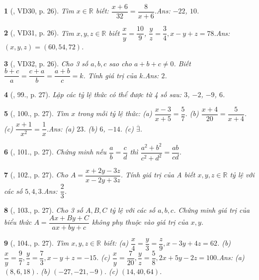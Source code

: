 \documentclass{article}
\newtheorem{baitoan}{}
\begin{document}
\begin{baitoan}[\cite{Tuyen_Toan_7}, VD30, p. 26]
	Tìm $x\in\mathbb{R}$ biết: $\dfrac{x + 6}{32} = \dfrac{8}{x + 6}$.\hfill{\sf Ans:} $-22$, $10$.
\end{baitoan}

\begin{baitoan}[\cite{Tuyen_Toan_7}, VD31, p. 26]
	Tìm $x,y,z\in\mathbb{R}$ biết $\dfrac{x}{y} = \dfrac{10}{9}$, $\dfrac{y}{z} = \dfrac{3}{4},x - y + z = 78$.\hfill{\sf Ans:} $(x,y,z) = (60,54,72)$.
\end{baitoan}

\begin{baitoan}[\cite{Tuyen_Toan_7}, VD32, p. 26]
	Cho 3 số $a,b,c$ sao cho $a + b + c\ne 0$. Biết $\dfrac{b + c}{a} = \dfrac{c + a}{b} = \dfrac{a + b}{c} = k$. Tính giá trị của $k$.\hfill{\sf Ans:} $2$.
\end{baitoan}

\begin{baitoan}[\cite{Tuyen_Toan_7}, 99., p. 27]
	Lập các tỷ lệ thức có thể được từ 4 số sau: $3$, $-2$, $-9$, $6$.
\end{baitoan}

\begin{baitoan}[\cite{Tuyen_Toan_7}, 100., p. 27]
	Tìm $x$ trong mỗi tỷ lệ thức: (a) $\dfrac{x - 3}{x + 5} = \dfrac{5}{7}$. (b) $\dfrac{x + 4}{20} = \dfrac{5}{x + 4}$. (c) $\dfrac{x + 1}{x^2} = \dfrac{1}{x}$.\hfill{\sf Ans:} (a) $23$. (b) $6$, $-14$. (c) $\overline{\exists}$.
\end{baitoan}

\begin{baitoan}[\cite{Tuyen_Toan_7}, 101., p. 27]
	Chứng minh nếu $\dfrac{a}{b} = \dfrac{c}{d}$ thì $\dfrac{a^2 + b^2}{c^2 + d^2} = \dfrac{ab}{cd}$.
\end{baitoan}

\begin{baitoan}[\cite{Tuyen_Toan_7}, 102., p. 27]
	Cho $A = \dfrac{x + 2y - 3z}{x - 2y + 3z}$. Tính giá trị của A biết $x,y,z\in\mathbb{R}$ tỷ lệ với các số $5,4,3$.\hfill{\sf Ans:} $\dfrac{2}{3}$.
\end{baitoan}

\begin{baitoan}[\cite{Tuyen_Toan_7}, 103., p. 27]
	Cho 3 số $A,B,C$ tỷ lệ với các số $a,b,c$. Chứng minh giá trị của biểu thức $A = \dfrac{Ax + By + C}{ax + by + c}$ không phụ thuộc vào giá trị của $x,y$.
\end{baitoan}

\begin{baitoan}[\cite{Tuyen_Toan_7}, 104., p. 27]
	Tìm $x,y,z\in\mathbb{R}$ biết: (a) $\dfrac{x}{4} = \dfrac{y}{3} = \dfrac{z}{9},x - 3y + 4z = 62$. (b) $\dfrac{x}{y} = \dfrac{9}{7},\dfrac{y}{z} = \dfrac{7}{3},x - y + z = -15$. (c) $\dfrac{x}{y} = \dfrac{7}{20},\dfrac{y}{z} = \dfrac{5}{8},2x + 5y - 2z = 100$.\hfill{\sf Ans:} (a) $(8,6,18)$. (b) $(-27,-21,-9)$. (c) $(14,40,64)$.
\end{baitoan}
\end{document}
